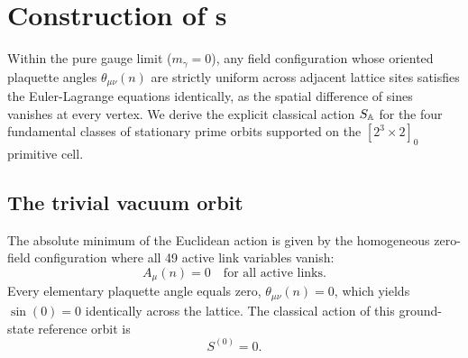 \documentclass[11pt,a4paper]{article}
\begin{document}
\section{Construction of {\primeOrb}s}

Within the pure gauge limit ($m_\gamma = 0$), any field configuration whose oriented plaquette angles $\theta_{\mu\nu}(n)$ are strictly uniform across adjacent lattice sites satisfies the Euler-Lagrange equations identically, as the spatial difference of sines vanishes at every vertex. We derive the explicit classical action $S_{\mathbb{A}}$ for the four fundamental classes of stationary prime orbits supported on the $[2^3 \times 2]_0$ primitive cell.

\subsection{The trivial vacuum orbit}
The absolute minimum of the Euclidean action is given by the homogeneous zero-field configuration where all 49 active link variables vanish:
\begin{equation}
A_\mu(n) = 0 \quad \text{for all active links.}
\end{equation}
Every elementary plaquette angle equals zero, $\theta_{\mu\nu}(n) = 0$, which yields $\sin(0) = 0$ identically across the lattice. The classical action of this ground-state reference orbit is
\begin{equation}
S^{(0)} = 0.
\end{equation}
\end{document}
